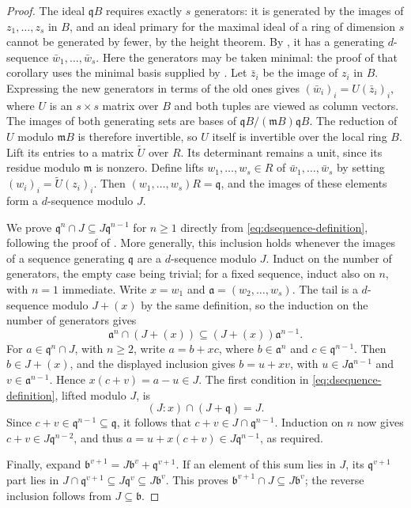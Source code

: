 \documentclass[11pt,reqno]{amsart}
\numberwithin{equation}{section}
\theoremstyle{definition}
\begin{document}
\begin{proof}
The ideal $\mathfrak qB$ requires exactly $s$ generators: it is
generated by the images of $z_1,\ldots,z_s$ in $B$, and an ideal primary
for the maximal ideal of a ring of dimension $s$ cannot be generated
by fewer, by the height theorem. By \cite[Corollary~5.2(ii)]{Trung1998}, it has a generating
$d$-sequence $\bar w_1,\ldots,\bar w_s$. Here the generators may
be taken minimal: the proof of that corollary uses the minimal
basis supplied by \cite[Theorem~4.9]{Trung1998}.
Let $\bar z_i$ be the image of $z_i$ in $B$. Expressing the new
generators in terms of the old ones gives
$(\bar w_i)_i=U(\bar z_i)_i$, where $U$ is an $s\times s$ matrix over
$B$ and both tuples are viewed as column vectors. The images of both
generating sets are bases of
$\mathfrak qB/(\mathfrak mB)\mathfrak qB$. The reduction of
$U$ modulo $\mathfrak mB$ is therefore invertible, so $U$
itself is invertible over the local ring $B$.
Lift its entries to a matrix $\widetilde U$ over $R$. Its
determinant remains a unit, since its residue modulo
$\mathfrak m$ is nonzero. Define lifts $w_1,\ldots,w_s\in R$ of
$\bar w_1,\ldots,\bar w_s$ by setting
$(w_i)_i=\widetilde U(z_i)_i$.
Then $(w_1,\ldots,w_s)R=\mathfrak q$, and the images of these
elements form a $d$-sequence modulo $J$.

We prove $\mathfrak q^n\cap J\subseteq J\mathfrak q^{n-1}$
for $n\geq1$ directly from \eqref{eq:dsequence-definition},
following the proof of \cite[Theorem~2.1]{Huneke82}.
More generally, this inclusion holds whenever the images of a
sequence generating $\mathfrak q$ are a $d$-sequence modulo $J$.
Induct on the number of generators, the empty case being trivial;
for a fixed sequence, induct also on $n$, with $n=1$ immediate.
Write $x=w_1$ and $\mathfrak a=(w_2,\ldots,w_s)$.
The tail is a $d$-sequence modulo $J+(x)$ by the same definition,
so the induction on the number of generators gives
\[
 \mathfrak a^n\cap(J+(x))\subseteq(J+(x))\mathfrak a^{n-1}.
\]
For $a\in\mathfrak q^n\cap J$, with $n\geq2$, write
$a=b+xc$, where $b\in\mathfrak a^n$ and $c\in\mathfrak q^{n-1}$.
Then $b\in J+(x)$, and the displayed inclusion gives
$b=u+xv$, with $u\in J\mathfrak a^{n-1}$ and
$v\in\mathfrak a^{n-1}$. Hence
$x(c+v)=a-u\in J$. The first condition in
\eqref{eq:dsequence-definition}, lifted modulo $J$, is
\[
 (J:x)\cap(J+\mathfrak q)=J.
\]
Since $c+v\in\mathfrak q^{n-1}\subseteq\mathfrak q$, it follows
that $c+v\in J\cap\mathfrak q^{n-1}$.
Induction on $n$ now gives $c+v\in J\mathfrak q^{n-2}$, and thus
$a=u+x(c+v)\in J\mathfrak q^{n-1}$, as required.

Finally, expand $\mathfrak b^{v+1}=J\mathfrak b^v+\mathfrak q^{v+1}$. If an element
of this sum lies in $J$, its $\mathfrak q^{v+1}$ part lies in
$J\cap\mathfrak q^{v+1}\subseteq J\mathfrak q^v\subseteq J\mathfrak b^v$.
This proves $\mathfrak b^{v+1}\cap J\subseteq J\mathfrak b^v$; the reverse inclusion
follows from $J\subseteq \mathfrak b$.
\end{proof}
\end{document}

